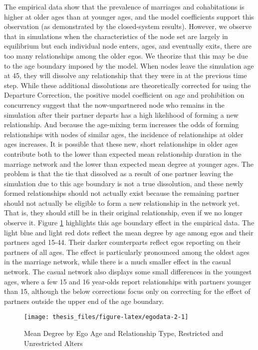 \documentclass [11pt, proquest] {uwthesis}[2015/03/03]
\begin{document}
The empirical data show that the prevalence of marriages and cohabitations is higher at older ages than at younger ages, and the model coefficients support this observation (as demonstrated by the closed-system results). However, we observe that in simulations when the characteristics of the node set are largely in equilibrium but each individual node enters, ages, and eventually exits, there are too many relationships among the older egos. We theorize that this may be due to the age boundary imposed by the model. When nodes leave the simulation age at 45, they will dissolve any relationship that they were in at the previous time step. While these additional dissolutions are theoretically corrected for using the Departure Correction, the positive model coefficient on age and prohibition on concurrency suggest that the now-unpartnered node who remains in the simulation after their partner departs has a high likelihood of forming a new relationship. And because the age-mixing term increases the odds of forming relationships with nodes of similar ages, the incidence of relationships at older ages increases. It is possible that these new, short relationships in older ages contribute both to the lower than expected mean relationship duration in the marriage network and the lower than expected mean degree at younger ages. The problem is that the tie that dissolved as a result of one partner leaving the simulation due to this age boundary is not a true dissolution, and these newly formed relationships should not actually exist because the remaining partner should not actually be eligible to form a new relationship in the network yet. That is, they should still be in their original relationship, even if we no longer observe it. Figure \ref{fig:egodata-2} highlights this age boundary effect in the empirical data. The light blue and light red dots reflect the mean degree by age among egos and their partners aged 15-44. Their darker counterparts reflect egos reporting on their partners of all ages. The effect is particularly pronounced among the oldest ages in the marriage network, while there is a much smaller effect in the casual network. The casual network also displays some small differences in the youngest ages, where a few 15 and 16 year-olds report relationships with partners younger than 15, although the below corrections focus only on correcting for the effect of partners outside the upper end of the age boundary.
\begin{figure}

{\centering \texttt{[image: thesis\_files/figure-latex/egodata-2-1]} 

}

\caption{Mean Degree by Ego Age and Relationship Type, Restricted and Unrestricted Alters}\label{fig:egodata-2}
\end{figure}
\end{document}
